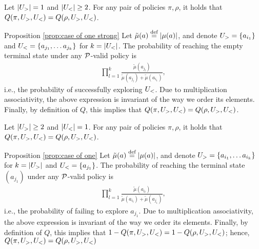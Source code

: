 \begin{proposition}\label{prop:case of one strong}
Let $\left| U_> \right|=1$ and $\left| U_< \right| \geq 2$. For any pair of policies $\pi,\rho$, it holds that $Q(\pi,U_>,U_<)=Q(\rho,U_>,U_<)$.
\end{proposition}
\begin{proofof}{Proposition \ref{prop:case of one strong}}
Let $\tilde \mu(a)\stackrel{\text{def}}{=} \left| \mu(a) \right|$, and denote $U_>=\{a_{i_1}\}$  and $U_<=\{a_{j_1},\dots a_{j_k}\}$ for $k=\left| U_< \right|$. The probability of reaching the empty terminal state under any $\mathcal{P}$-valid policy is
\begin{align*}
\prod_{l=1}^k\frac{\tilde \mu(a_{j_l})}{\tilde \mu(a_{j_l})+\tilde \mu(a_{i_1})},
\end{align*}
i.e., the probability of successfully exploring $U_<$. Due to multiplication associativity, the above expression is invariant of the way we order its elements. Finally, by definition of $Q$, this implies that $Q(\pi,U_>,U_<)=Q(\rho,U_>,U_<)$.
\end{proofof}

\begin{proposition}\label{prop:case of one}
Let $\left| U_> \right|\geq 2$ and $\left| U_< \right| = 1$. For any pair of policies $\pi,\rho$, it holds that $Q(\pi,U_>,U_<)=Q(\rho,U_>,U_<)$.
\end{proposition}
\begin{proofof}{Proposition \ref{prop:case of one}}
Let $\tilde \mu(a)\stackrel{\text{def}}{=} \left| \mu(a) \right|$, and denote $U_>=\{a_{i_1},\dots a_{i_k}\}$ for $k=\left| U_> \right|$ and $U_<=\{a_{j_1}\}$. The probability of reaching the terminal state $(a_{j_1})$ under any $\mathcal{P}$-valid policy is
\begin{align*}
\prod_{l=1}^k\frac{\tilde \mu(a_{i_l})}{\tilde \mu(a_{i_l})+\tilde \mu(a_{j_1})},
\end{align*}
i.e., the probability of failing to explore $a_{j_1}$. Due to multiplication associativity, the above expression is invariant of the way we order its elements. Finally, by definition of $Q$, this implies that $1-Q(\pi,U_>,U_<)=1-Q(\rho,U_>,U_<)$; hence, $Q(\pi,U_>,U_<)=Q(\rho,U_>,U_<)$
\end{proofof}


